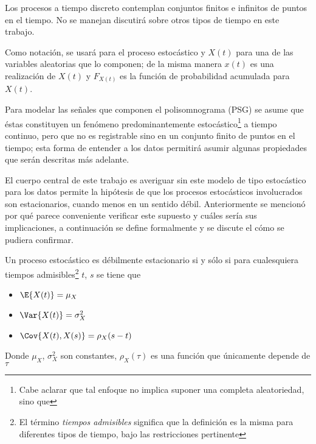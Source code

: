 Los procesos a tiempo discreto contemplan conjuntos finitos e infinitos de puntos en el tiempo.
No se manejan discutir\'a sobre otros tipos de tiempo en este trabajo.

Como notaci\'on, se usar\'a \xt  para el proceso estoc\'astico y $X(t)$ para una de las variables
aleatorias que lo componen; de la misma manera $x(t)$ es una realizaci\'on de $X(t)$ y $F_{X(t)}$ 
es la funci\'on de probabilidad acumulada para $X(t)$.

Para modelar las se\~nales que componen el polisomnograma (PSG) se asume que éstas
constituyen un fen\'omeno predominantemente estocástico\footnote{Cabe aclarar que tal enfoque no
implica suponer una completa aleatoriedad, sino que} a tiempo 
continuo, pero que no es registrable sino en un conjunto finito de puntos en el tiempo; 
esta forma de entender a los datos 
permitir\'a asumir algunas propiedades que ser\'an descritas m\'as adelante.

El cuerpo central de este trabajo es averiguar sin este modelo de tipo estocástico para los datos
permite la hipótesis de que los procesos estocásticos involucrados son estacionarios, cuando menos en
un sentido débil. Anteriormente se mencionó por qué parece conveniente verificar este supuesto y cuáles
sería sus implicaciones, a continuación se define formalmente y se discute el cómo se
pudiera confirmar.

\begin{defn}
Un proceso estoc\'astico \xt es d\'ebilmente estacionario si y s\'olo si para cualesquiera tiempos 
admisibles\footnote{El t\'ermino \textit{tiempos admisibles} significa que la definición es la misma
para diferentes tipos de tiempo, bajo las restricciones pertinente} $t$, $s$ se tiene que
\begin{itemize}
\item $\E{X(t)} = \mu_X$
\item $\Var{X(t)} = \sigma^{2}_X$
\item $\Cov{X(t),X(s)} = \rho_X (s-t)$
\end{itemize}
Donde $\mu_X$, $\sigma^{2}_X$ son constantes, $\rho_X(\tau)$ es una funci\'on que \'unicamente 
depende de $\tau$
\label{est_orden_primera}
\end{defn}

